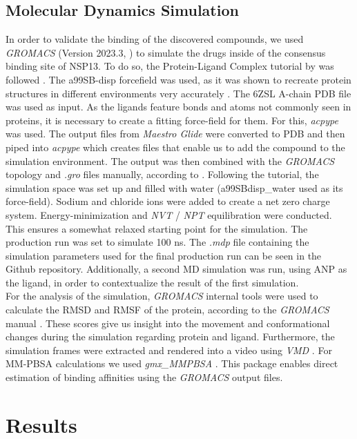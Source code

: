 \documentclass[11pt, letterpaper, titlepage]{article}
\renewcommand{\cite}{\parencite}
\begin{document}
\subsection{Molecular Dynamics Simulation}
In order to validate the binding of the discovered compounds, we used \textit{GROMACS} (Version 2023.3, \textcite{packageGROMACS}) to simulate the drugs inside of the consensus binding site of NSP13. To do so, the Protein-Ligand Complex tutorial by  was followed \cite{Lemkul2018}. The a99SB-disp forcefield was used, as it was shown to recreate protein structures in different environments very accurately \cite{Forcefield}. The 6ZSL A-chain PDB file was used as input. 
As the ligands feature bonds and atoms not commonly seen in proteins, it is necessary to create a fitting force-field for them. For this, \textit{acpype} \cite{acpype} was used. The output files from \textit{Maestro Glide} were converted to PDB and then piped into \textit{acpype} which creates files that enable us to add the compound to the simulation environment. The output was then combined with the \textit{GROMACS} topology and \textit{.gro} files manually, according to .
Following the tutorial, the simulation space was set up and filled with water (a99SBdisp\_water used as its force-field). Sodium and chloride ions were added to create a net zero charge system. Energy-minimization and \textit{NVT} / \textit{NPT} equilibration were conducted. This ensures a somewhat relaxed starting point for the simulation. The production run was set to simulate 100 ns. The \textit{.mdp} file containing the simulation parameters used for the final production run can be seen in the Github repository. Additionally, a second \ac{MD} simulation was run, using ANP as the ligand, in order to contextualize the result of the first simulation.\\
For the analysis of the simulation, \textit{GROMACS} internal tools were used to calculate the RMSD and RMSF of the protein, according to the \textit{GROMACS} manual \cite{packageGROMACS}. These scores give us insight into the movement and conformational changes during the simulation regarding protein and ligand. Furthermore, the simulation frames were extracted and rendered into a video using \textit{VMD} \cite{VMD}. For MM-PBSA calculations we used \textit{gmx\_MMPBSA} \cite{MMPBSA1}. This package enables direct estimation of binding affinities using the \textit{GROMACS} output files.

\section{Results}
\end{document}
